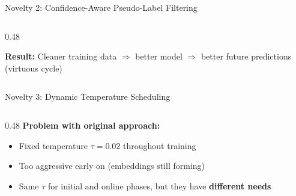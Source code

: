\documentclass[aspectratio=169]{beamer}
\begin{document}
\begin{frame}{Novelty 2: Confidence-Aware Pseudo-Label Filtering}
\begin{columns}[T]
\begin{column}{0.48\textwidth}

            \vspace{0.3cm}
            {\footnotesize \textbf{Result:} Cleaner training data $\Rightarrow$ better model $\Rightarrow$ better future predictions (virtuous cycle)}
        \end{column}
    \end{columns}
\end{frame}

\begin{frame}{Novelty 3: Dynamic Temperature Scheduling}
    \begin{columns}[T]
        \begin{column}{0.48\textwidth}
            \textbf{Problem with original approach:}
            \begin{itemize}
                \item Fixed temperature $\tau = 0.02$ throughout training
                \item Too aggressive early on (embeddings still forming)
                \item Same $\tau$ for initial and online phases, but they have \textbf{different needs}
            \end{itemize}


\end{column}
\end{columns}
\end{frame}
\end{document}
